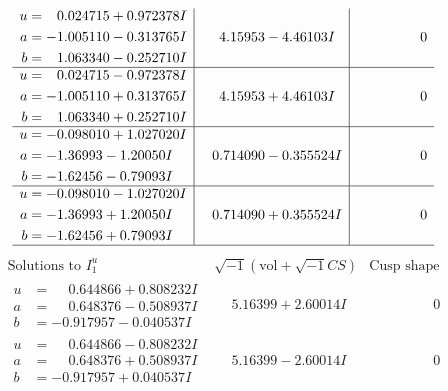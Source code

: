 \documentclass[1p]{elsarticle_modified}
\theoremstyle{definition}
\newcommand{\I}{\sqrt{-1}}
\begin{document}
$$\begin{array}{c|c|c}
\begin{aligned}
u &= \phantom{-}0.024715 + 0.972378 I \\
a &= -1.005110 - 0.313765 I \\
b &= \phantom{-}1.063340 - 0.252710 I\end{aligned}
 & \phantom{-}4.15953 - 4.46103 I & \phantom{-0.000000 } 0 \\ \hline\begin{aligned}
u &= \phantom{-}0.024715 - 0.972378 I \\
a &= -1.005110 + 0.313765 I \\
b &= \phantom{-}1.063340 + 0.252710 I\end{aligned}
 & \phantom{-}4.15953 + 4.46103 I & \phantom{-0.000000 } 0 \\ \hline\begin{aligned}
u &= -0.098010 + 1.027020 I \\
a &= -1.36993 - 1.20050 I \\
b &= -1.62456 - 0.79093 I\end{aligned}
 & \phantom{-}0.714090 - 0.355524 I & \phantom{-0.000000 } 0 \\ \hline\begin{aligned}
u &= -0.098010 - 1.027020 I \\
a &= -1.36993 + 1.20050 I \\
b &= -1.62456 + 0.79093 I\end{aligned}
 & \phantom{-}0.714090 + 0.355524 I & \phantom{-0.000000 } 0\\
 \hline 
 \end{array}$$\newpage$$\begin{array}{c|c|c}  
\text{Solutions to }I^u_{1}& \I (\text{vol} + \sqrt{-1}CS) & \text{Cusp shape}\\
 \hline 
\begin{aligned}
u &= \phantom{-}0.644866 + 0.808232 I \\
a &= \phantom{-}0.648376 - 0.508937 I \\
b &= -0.917957 - 0.040537 I\end{aligned}
 & \phantom{-}5.16399 + 2.60014 I & \phantom{-0.000000 } 0 \\ \hline\begin{aligned}
u &= \phantom{-}0.644866 - 0.808232 I \\
a &= \phantom{-}0.648376 + 0.508937 I \\
b &= -0.917957 + 0.040537 I\end{aligned}
 & \phantom{-}5.16399 - 2.60014 I & \phantom{-0.000000 } 0 \\ \hline\begin{aligned}

\end{aligned}
\end{array}$$
\end{document}
